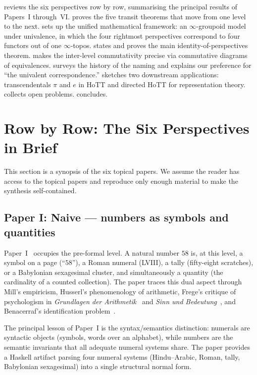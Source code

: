 \documentclass[12pt]{article}
\theoremstyle{definition}
\theoremstyle{remark}
\begin{document}
 reviews the six perspectives row by row, summarising
the principal results of Papers~I through~VI.  proves the
five transit theorems that move from one level to the next.
 sets up the unified mathematical framework: an
$\infty$-groupoid model under univalence, in which the four rightmost
perspectives correspond to four functors out of one $\infty$-topos.
 states and proves the main identity-of-perspectives
theorem.  makes the inter-level commutativity precise via
commutative diagrams of equivalences.  surveys the history
of the naming and explains our preference for ``the univalent
correspondence.''  sketches two downstream
applications: transcendentals $\pi$ and $e$ in HoTT and directed HoTT for
representation theory.  collects open problems. 
concludes.

\section{Row by Row: The Six Perspectives in Brief}
\label{sec:row-by-row}

This section is a synopsis of the six topical papers. We assume the reader
has access to the topical papers and reproduce only enough material to
make the synthesis self-contained.

\subsection{Paper I: Naive --- numbers as symbols and quantities}
\label{sec:row-i}

Paper~I~\cite{paper-i} occupies the pre-formal level. A natural number $58$
is, at this level, a symbol on a page (``$58$''), a Roman numeral
(\textsf{LVIII}), a tally (fifty-eight scratches), or a Babylonian
sexagesimal cluster, and simultaneously a quantity (the cardinality of a
counted collection). The paper traces this dual aspect through Mill's
empiricism, Husserl's phenomenology of arithmetic, Frege's critique of
psychologism in \emph{Grundlagen der Arithmetik}~\cite{frege1884} and
\emph{Sinn und Bedeutung}~\cite{frege1892}, and Benacerraf's identification
problem~\cite{benacerraf1965}.

The principal lesson of Paper~I is the syntax/semantics distinction: numerals
are syntactic objects (symbols, words over an alphabet), while numbers are
the semantic invariants that all adequate numeral systems share. The paper
provides a Haskell artifact parsing four numeral systems (Hindu--Arabic,
Roman, tally, Babylonian sexagesimal) into a single structural normal form.
\end{document}
